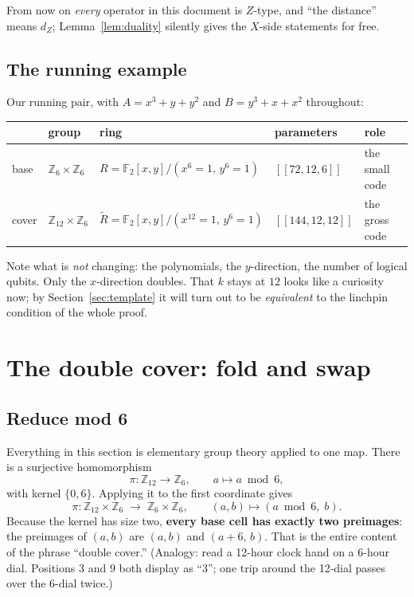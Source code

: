 \documentclass[11pt]{article}
\theoremstyle{plain}
\theoremstyle{definition}
\theoremstyle{remark}
\newcommand{\F}{\mathbb{F}}
\newcommand{\Z}{\mathbb{Z}}
\newcommand{\Rbase}{R}
\newcommand{\Rcov}{\widetilde{R}}
\begin{document}
From now on \emph{every} operator in this document is $Z$-type, and ``the
distance'' means $d_Z$; Lemma~\ref{lem:duality} silently gives the $X$-side
statements for free.

\subsection{The running example}

Our running pair, with $A = x^3 + y + y^2$ and $B = y^3 + x + x^2$ throughout:

\begin{center}
\begin{tabular}{lllll}
\toprule
 & group & ring & parameters & role\\
\midrule
base & $\Z_6 \times \Z_6$ & $\Rbase = \F_2[x,y]/(x^{6}{=}1,\,y^{6}{=}1)$ &
$[[72,12,6]]$ & the small code\\
cover & $\Z_{12} \times \Z_6$ & $\Rcov = \F_2[x,y]/(x^{12}{=}1,\,y^{6}{=}1)$ &
$[[144,12,12]]$ & the gross code\\
\bottomrule
\end{tabular}
\end{center}

Note what is \emph{not} changing: the polynomials, the $y$-direction, the
number of logical qubits. Only the $x$-direction doubles. That $k$ stays at
$12$ looks like a curiosity now; by Section~\ref{sec:template} it will turn out
to be \emph{equivalent} to the linchpin condition of the whole proof.

\section{The double cover: fold and swap}
\label{sec:cover}

\subsection{Reduce mod 6}

Everything in this section is elementary group theory applied to one map.
There is a surjective homomorphism
\[
\pi : \Z_{12} \to \Z_6, \qquad a \mapsto a \bmod 6,
\]
with kernel $\{0, 6\}$. Applying it to the first coordinate gives
\[
\pi : \Z_{12}\times\Z_6 \;\to\; \Z_6\times\Z_6, \qquad
(a, b) \mapsto (a \bmod 6,\; b).
\]
Because the kernel has size two, \textbf{every base cell has exactly two
preimages}: the preimages of $(a,b)$ are $(a,b)$ and $(a{+}6,\,b)$. That is the
entire content of the phrase ``double cover.'' (Analogy: read a 12-hour clock
hand on a 6-hour dial. Positions $3$ and $9$ both display as ``3''; one trip
around the 12-dial passes over the 6-dial twice.)
\end{document}

